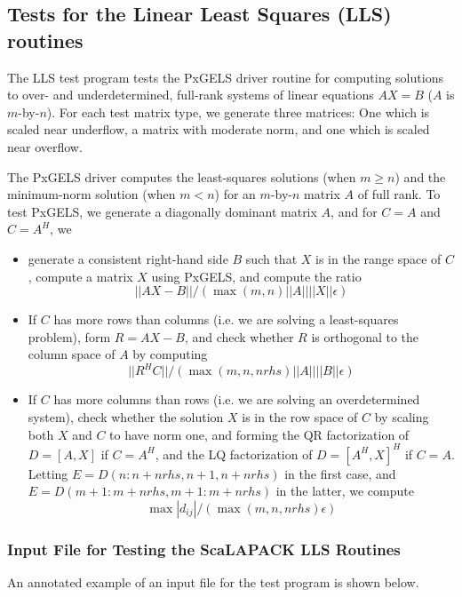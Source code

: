 \documentclass[11pt]{report}
\newcommand{\dent}{\hspace*{\parindent}}
\begin{document}
\subsection{Tests for the Linear Least Squares (LLS) routines}

The LLS test program tests the PxGELS driver routine for computing solutions
to over- and underdetermined, full-rank systems of
linear equations $AX = B$ ($A$ is $m$-by-$n$). For each test
matrix type, we generate three matrices: One which is scaled near
underflow, a matrix with moderate norm, and one which is scaled
near overflow.

The PxGELS driver
computes the least-squares
solutions (when $m \ge n$) and the
minimum-norm solution (when $m < n$) for an $m$-by-$n$ matrix $A$
of full rank. To test PxGELS, we generate a diagonally
dominant matrix $A$, and for $C = A$ and $C = A^H$, we
\begin{itemize}
\item generate a consistent right-hand side $B$ such that $X$ is in
the range space of $C$, compute a matrix $X$ using PxGELS, and compute
the ratio
        $$||AX - B||/(\max(m,n) ||A|| ||X|| \epsilon)$$

\item If $C$ has more rows than columns (i.e. we are solving a
least-squares problem), form $R = AX - B$, and check whether
$R$ is orthogonal to the column space of $A$ by computing
        $$|| R^H C ||/(\max(m,n,nrhs)||A|| ||B|| \epsilon)$$
\item
If $C$ has more columns than rows (i.e. we are solving an
overdetermined system), check whether the solution $X$ is
in the row space of $C$ by scaling both $X$ and $C$ to have
norm one, and forming the QR factorization
of $D = [A,X]$ if $C = A^H$, and the LQ factorization of
$D = [A^H,X]^H$ if $C = A$. Letting $E = D(n:n+nrhs,n+1,n+nrhs)$ in the
first case, and $E = D(m+1:m+nrhs,m+1:m+nrhs)$ in the latter,
we compute
        $$\max |d_{ij}| / (\max(m,n,nrhs) \epsilon)$$
\end{itemize}

\subsubsection{Input File for Testing the ScaLAPACK LLS Routines}
\dent
An annotated example of an input file for the
test program is shown below.
\end{document}
